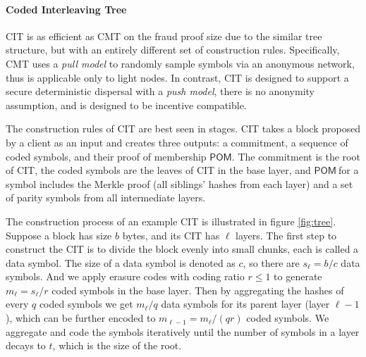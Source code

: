 \documentclass{article}
\newcommand{\POM}{$\mathsf{POM}\ $}
\begin{document}
\begin{table}
\centering
\caption{System Performance Metrics}
\label{tab:metrics}
\renewcommand{\tabularxcolumn}{m} 
\end{table}



\paragraph{Coded Interleaving Tree} CIT is as efficient as CMT on the fraud proof size due to the similar tree structure, but with an entirely different set of construction rules. Specifically, CMT uses a {\em pull model} to randomly sample symbols via an anonymous network, thus is applicable only to light nodes. In contrast, CIT is designed to support a secure deterministic dispersal with a {\em push model}, there is no anonymity assumption, and  is designed to be incentive compatible.

The construction rules of CIT are best seen in stages.  
CIT takes a block proposed by a client as an input and creates three outputs: a commitment, a sequence of coded symbols, and their proof of membership $\mathsf{POM}$. The commitment is the root of CIT, the coded symbols are the leaves of CIT in the base layer, and \POM for a symbol includes the Merkle proof (all siblings' hashes from each layer) and a set of parity symbols from all intermediate layers. 

The construction process of an example CIT is illustrated in figure \ref{fig:tree}. Suppose a block has size $b$ bytes, and its CIT has $\ell$ layers. The first step to construct the CIT is to divide the block evenly into small chunks, each is called a data symbol. The size of a data symbol is denoted as $c$, so there are $s_{\ell} = b/c$ data symbols. And we apply erasure codes with coding ratio $r \le 1$ to generate $m_{\ell} =s_\ell/r$  coded symbols in the base layer. Then by aggregating the hashes of every $q$ coded symbols we get $m_{\ell}/q$ data symbols for its parent layer (layer $\ell-1$), which can be further encoded to $m_{\ell-1} = m_\ell/(qr)$ coded symbols. We aggregate and code the symbols iteratively until the number of symbols in a layer decays to $t$, which is the size of the root.
\end{document}
